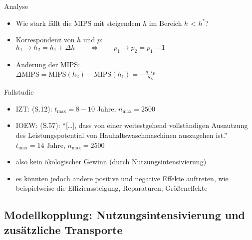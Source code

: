 \documentclass[beamer, xcolor={table,usenames,dvipsnames}]{beamer}
\newcommand{\n}[1]{n_\text{#1}}
\renewcommand{\t}[1]{t_\text{#1}}
\begin{document}
	\begin{frame}{Analyse}		
		\begin{itemize}
			\item<1-> Wie stark fällt die MIPS mit steigendem $h$ im Bereich $h$ < $h^*$?
			\item<2-> Korrespondenz von $h$ und $p$: \\ $h_1 \rightarrow h_2 = h_1 + \Delta h \qquad \Leftrightarrow \qquad p_1 \rightarrow p_2 = p_1 -1$
			\item<3-> Änderung der MIPS: \\ $\Delta \text{MIPS} = \text{MIPS}(h_2) - \text{MIPS}(h_1) = - \frac{q \cdot i_P}{S_D}$
		\end{itemize}
		\begin{center}
			\resizebox{0.5\linewidth}{!}{
				
			}
		\end{center}
	\end{frame}

    \begin{frame}{Fallstudie}
        \begin{itemize}
            \item IZT: (S.12): $\t{max} = 8 - 10$ Jahre, $\n{max} = 2500$
            \item IOEW: (S.57): "`[\dots], dass von einer weitestgehend
                vollständigen Ausnutzung des Leistungspotential von
                Hauhaltswaschmaschinen auszugehen ist."' 
                $\t{max} = 14$ Jahre, $\n{max} = 2500$
            \item also kein ökologischer Gewinn (durch Nutzungsintensivierung)
            \item es könnten jedoch andere positive und negative Effekte
                auftreten, wie beispielweise die Effizienssteigung, Reparaturen,
                Größeneffekte
        \end{itemize}
    \end{frame}
    \subsection{Modellkopplung: Nutzungsintensivierung und zusätzliche Transporte}
    \frame{\subsectionpage}
    
\end{document}
